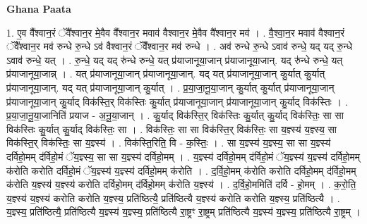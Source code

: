 \documentclass[17pt]{extarticle}
\begin{document}
\textbf{Ghana Paata } \newline

1. ए॒व वै᳚श्वान॒रं ॅवै᳚श्वान॒र मे॒वैव वै᳚श्वान॒र मवाव॑ वैश्वान॒र मे॒वैव वै᳚श्वान॒र मव॑ । . वै॒श्वा॒न॒र मवाव॑ वैश्वान॒रं ॅवै᳚श्वान॒र मव॑ रुन्धे रु॒न्धे ऽव॑ वैश्वान॒रं ॅवै᳚श्वान॒र मव॑ रुन्धे । . अव॑ रुन्धे रु॒न्धे ऽवाव॑ रुन्धे॒ यद् यद् रु॒न्धे ऽवाव॑ रुन्धे॒ यत् । . रु॒न्धे॒ यद् यद् रु॑न्धे रुन्धे॒ यत् प्र॑याजानूया॒जान् प्र॑याजानूया॒जान्. यद् रु॑न्धे रुन्धे॒ यत् प्र॑याजानूया॒जान्न् । . यत् प्र॑याजानूया॒जान् प्र॑याजानूया॒जान्. यद् यत् प्र॑याजानूया॒जान् कु॒र्यात् कु॒र्यात् प्र॑याजानूया॒जान्. यद् यत् प्र॑याजानूया॒जान् कु॒र्यात् । . प्र॒या॒जा॒नू॒या॒जान् कु॒र्यात् कु॒र्यात् प्र॑याजानूया॒जान् प्र॑याजानूया॒जान् कु॒र्याद् विक॑स्ति॒र् विक॑स्तिः कु॒र्यात् प्र॑याजानूया॒जान् प्र॑याजानूया॒जान् कु॒र्याद् विक॑स्तिः । . प्र॒या॒जा॒नू॒या॒जानिति॑ प्रयाज - अ॒नू॒या॒जान् । . कु॒र्याद् विक॑स्ति॒र् विक॑स्तिः कु॒र्यात् कु॒र्याद् विक॑स्तिः॒ सा सा विक॑स्तिः कु॒र्यात् कु॒र्याद् विक॑स्तिः॒ सा । . विक॑स्तिः॒ सा सा विक॑स्ति॒र् विक॑स्तिः॒ सा य॒ज्ञ्स्य॑ य॒ज्ञ्स्य॒ सा विक॑स्ति॒र् विक॑स्तिः॒ सा य॒ज्ञ्स्य॑ । . विक॑स्ति॒रिति॒ वि - क॒स्तिः॒ । . सा य॒ज्ञ्स्य॑ य॒ज्ञ्स्य॒ सा सा य॒ज्ञ्स्य॑ दर्विहो॒मम् द॑र्विहो॒मं ॅय॒ज्ञ्स्य॒ सा सा य॒ज्ञ्स्य॑ दर्विहो॒मम् । . य॒ज्ञ्स्य॑ दर्विहो॒मम् द॑र्विहो॒मं ॅय॒ज्ञ्स्य॑ य॒ज्ञ्स्य॑ दर्विहो॒मम् क॑रोति करोति दर्विहो॒मं ॅय॒ज्ञ्स्य॑ य॒ज्ञ्स्य॑ दर्विहो॒मम् क॑रोति । . द॒र्वि॒हो॒मम् क॑रोति करोति दर्विहो॒मम् द॑र्विहो॒मम् क॑रोति य॒ज्ञ्स्य॑ य॒ज्ञ्स्य॑ करोति दर्विहो॒मम् द॑र्विहो॒मम् क॑रोति य॒ज्ञ्स्य॑ । . द॒र्वि॒हो॒ममिति॑ दर्वि - हो॒मम् । . क॒रो॒ति॒ य॒ज्ञ्स्य॑ य॒ज्ञ्स्य॑ करोति करोति य॒ज्ञ्स्य॒ प्रति॑ष्ठित्यै॒ प्रति॑ष्ठित्यै य॒ज्ञ्स्य॑ करोति करोति य॒ज्ञ्स्य॒ प्रति॑ष्ठित्यै । . य॒ज्ञ्स्य॒ प्रति॑ष्ठित्यै॒ प्रति॑ष्ठित्यै य॒ज्ञ्स्य॑ य॒ज्ञ्स्य॒ प्रति॑ष्ठित्यै रा॒ष्ट्रꣳ रा॒ष्ट्रम् प्रति॑ष्ठित्यै य॒ज्ञ्स्य॑ य॒ज्ञ्स्य॒ प्रति॑ष्ठित्यै रा॒ष्ट्रम् । \newline
\end{document}
